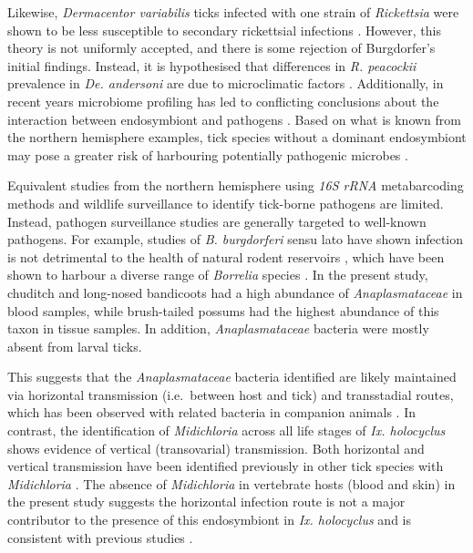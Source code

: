 \documentclass[a4paper, nobind]{templates/ociamthesis}
\begin{document}
Likewise, \emph{Dermacentor variabilis} ticks infected with one strain of \emph{Rickettsia} were shown to be less susceptible to secondary rickettsial infections \autocite{macalusoRickettsialInfectionDermacentor2002}.
However, this theory is not uniformly accepted, and there is some rejection of Burgdorfer's \autocite{burgdorferNonpathogenicRickettsiaeDermacentor1981} initial findings.
Instead, it is hypothesised that differences in \emph{R. peacockii} prevalence in \emph{De. andersoni} are due to microclimatic factors \autocite{telfordStatusEastSide2009}.
Additionally, in recent years microbiome profiling has led to conflicting conclusions about the interaction between endosymbiont and pathogens \autocite{bonnetUpdateIntricateTango2020}.
Based on what is known from the northern hemisphere examples, tick species without a dominant endosymbiont may pose a greater risk of harbouring potentially pathogenic microbes \autocite{bonnetUpdateIntricateTango2020}.

Equivalent studies from the northern hemisphere using \emph{16S rRNA} metabarcoding methods and wildlife surveillance to identify tick-borne pathogens are limited.
Instead, pathogen surveillance studies are generally targeted to well-known pathogens.
For example, studies of \emph{B. burgdorferi} sensu lato have shown infection is not detrimental to the health of natural rodent reservoirs \autocite{voordouwLymeDiseasePathogen2015}, which have been shown to harbour a diverse range of \emph{Borrelia} species \autocite{bunikisThirdBorreliaSpecies2005}.
In the present study, chuditch and long-nosed bandicoots had a high abundance of \emph{Anaplasmataceae} in blood samples, while brush-tailed possums had the highest abundance of this taxon in tissue samples.
In addition, \emph{Anaplasmataceae} bacteria were mostly absent from larval ticks.

This suggests that the \emph{Anaplasmataceae} bacteria identified are likely maintained via horizontal transmission (i.e.~between host and tick) and transstadial routes, which has been observed with related bacteria in companion animals \autocite{fourieTransmissionEhrlichiaCanis2013,almazanExperimentalIxodesRicinusSheep2020}.
In contrast, the identification of \emph{Midichloria} across all life stages of \emph{Ix. holocyclus} shows evidence of vertical (transovarial) transmission.
Both horizontal and vertical transmission have been identified previously in other tick species with \emph{Midichloria} \autocite{maricontiHumansParasitizedHard2012,serraMolecularSerologicalEvidence2018}.
The absence of \emph{Midichloria} in vertebrate hosts (blood and skin) in the present study suggests the horizontal infection route is not a major contributor to the presence of this endosymbiont in \emph{Ix. holocyclus} and is consistent with previous studies \autocite{mukhachevaBacteriaFamilyCandidatus2017}.
\end{document}

